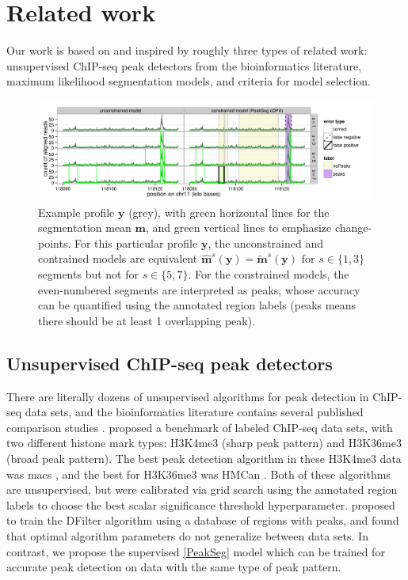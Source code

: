 \documentclass{article}
\begin{document}
\section{Related work}
\label{sec:related}

Our work is based on and inspired by roughly three types of related
work:
unsupervised ChIP-seq peak detectors from the bioinformatics
literature, maximum likelihood segmentation models, 
and criteria for model selection.

\begin{figure}[b!]
  \centering
  \includegraphics[width=\textwidth]{figure-Segmentor-PeakSeg}
  \vskip -0.5cm
  \caption{Example profile $\mathbf y$ (grey), with green horizontal
    lines for the segmentation mean $\mathbf m$, and green vertical
    lines to emphasize change-points. For this particular profile
    $\mathbf y$, the unconstrained and contrained models are
    equivalent $\mathbf{\hat m}^s(\mathbf y) = \mathbf{\tilde
      m}^s(\mathbf y)$ for $s\in\{1, 3\}$ segments but not for
    $s\in\{5, 7\}$. For the constrained models, the even-numbered
    segments are interpreted as peaks, whose accuracy can be
    quantified using the annotated region labels
    (\textcolor{peaks}{peaks} means there should be at least 1
    overlapping peak).}
  \label{fig:Segmentor-PeakSeg}
\end{figure}

\subsection{Unsupervised ChIP-seq peak detectors}

There are literally dozens of unsupervised algorithms for peak
detection in ChIP-seq data sets, and the bioinformatics literature
contains several published comparison studies \citep{evaluation2010,
  rye2010manually, chip-seq-bench}. \citet{hocking2014visual} proposed
a benchmark of labeled ChIP-seq data sets, with two different histone
mark types: H3K4me3 (sharp peak pattern) and H3K36me3 (broad peak
pattern). The best peak detection algorithm in these H3K4me3 data was
macs \citep{MACS}, and the best for H3K36me3 was HMCan
\citep{HMCan}. Both of these algorithms are unsupervised, but were
calibrated via grid search using the annotated region labels to choose
the best scalar significance threshold hyperparameter.
\citet{DFilter} proposed to train the DFilter algorithm using a
database of regions with peaks, and \citet{picking2012} found that
optimal algorithm parameters do not generalize between data sets. In
contrast, we propose the supervised \ref{PeakSeg} model which can be
trained for accurate peak detection on data with the same type of peak
pattern.
\end{document}
